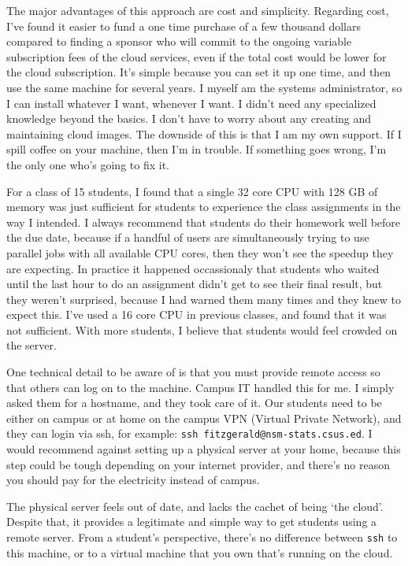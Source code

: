 \documentclass[12pt]{article}
\begin{document}
The major advantages of this approach are cost and simplicity.
Regarding cost, I've found it easier to fund a one time purchase of a few thousand dollars compared to finding a sponsor who will commit to the ongoing variable subscription fees of the cloud services, even if the total cost would be lower for the cloud subscription.
It's simple because you can set it up one time, and then use the same machine for several years.
I myself am the systems administrator, so I can install whatever I want, whenever I want.
I didn't need any specialized knowledge beyond the basics.
I don't have to worry about any creating and maintaining cloud images.
The downside of this is that I am my own support.
If I spill coffee on your machine, then I'm in trouble.
If something goes wrong, I'm the only one who's going to fix it.

For a class of 15 students, I found that a single 32 core CPU with 128 GB of memory was just sufficient for students to experience the class assignments in the way I intended.
I always recommend that students do their homework well before the due date, because if a handful of users are simultaneously trying to use parallel jobs with all available CPU cores, then they won't see the speedup they are expecting.
In practice it happened occassionaly that students who waited until the last hour to do an assignment didn't get to see their final result, but they weren't surprised, because I had warned them many times and they knew to expect this.
I've used a 16 core CPU in previous classes, and found that it was not sufficient.
With more students, I believe that students would feel crowded on the server.

One technical detail to be aware of is that you must provide remote access so that others can log on to the machine.
Campus IT handled this for me.
I simply asked them for a hostname, and they took care of it.
Our students need to be either on campus or at home on the campus VPN (Virtual Private Network), and they can login via ssh, for example: \texttt{ssh fitzgerald@nsm-stats.csus.ed}.
I would recommend against setting up a physical server at your home, because this step could be tough depending on your internet provider, and there's no reason you should pay for the electricity instead of campus.

The physical server feels out of date, and lacks the cachet of being `the cloud'.
Despite that, it provides a legitimate and simple way to get students using a remote server.
From a student's perspective, there's no difference between \texttt{ssh} to this machine, or to a virtual machine that you own that's running on the cloud.
\end{document}
